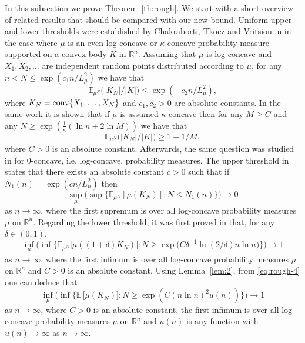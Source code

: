 \documentclass[11pt,leqno]{article}
\theoremstyle{definition}
\theoremstyle{remark}
\numberwithin{equation}{section}
\newcommand{\ls}{\leqslant}
\newcommand{\gr}{\geqslant}
\newcommand{\1}{\textbf{1}}
\begin{document}
In this subsection we prove Theorem~\ref{th:rough}. We start with a short overview of related results that should be
compared with our new bound. Uniform upper and lower thresholds were established by Chakraborti, Tkocz and Vritsiou in \cite{Chakraborti-Tkocz-Vritsiou-2021} in the case where $\mu $ is an even log-concave or $\kappa$-concave probability
measure supported on a convex body $K$ in ${\mathbb R}^n$. Assuming that $\mu$ is log-concave and $X_1,X_2,\ldots $ are independent random points distributed according to $\mu $, for any $n<N\ls \exp (c_1n/L_{\mu }^2)$ we have that
\begin{equation}\label{eq:rough-1}{\mathbb E}_{\mu^N}\big(|K_N|/|K|\big) \ls \exp\left(-c_2n/L_{\mu }^2\right),\end{equation}
where $K_N={\rm conv}\{X_1,\ldots ,X_N\}$ and $c_1,c_2>0$ are absolute constants. In the same work it is
shown that if $\mu $ is assumed $\kappa $-concave then for any $M\gr C$ and any $N\gr \exp\left(\frac{1}{\kappa }(\ln n+2\ln M)\right)$ we have that
\begin{equation}\label{eq:rough-2}{\mathbb E}_{\mu^N}\big(|K_N|/|K|\big)\gr 1-1/M,\end{equation}
where $C>0$ is an absolute constant. Afterwards, the same question was studied in \cite{BGP-depth} for $0$-concave, i.e. log-concave, probability measures. The upper threshold in \cite{BGP-depth} states that there exists an absolute constant $c>0$ such that if $N_1(n)=\exp (cn/L_n^2)$ then
\begin{equation}\label{eq:rough-3}\sup_{\mu }\Big(\sup\Big\{{\mathbb E}_{\mu^N}[\mu (K_N)]:N\ls N_1(n)\Big\}\Big)\longrightarrow 0\end{equation}
as $n\to\infty $, where the first supremum is over all log-concave probability measures $\mu $ on ${\mathbb R}^n$.
Regarding the lower threshold, it was first proved in \cite{BGP-depth} that, for any $\delta\in (0,1)$,
\begin{equation}\label{eq:rough-4}\inf_{\mu }\Big(\inf\Big\{ {\mathbb E}_{\mu^N}\big[\mu ((1+\delta )K_N)\big]: N\gr \exp \big (C\delta^{-1}\ln \left(2/\delta \right)n\ln n\big )\Big\}\Big)\longrightarrow 1\end{equation} as $n\to\infty $, where the first infimum is over all log-concave probability measures $\mu $ on ${\mathbb R}^n$ and $C>0$ is an absolute constant.
Using Lemma~\ref{lem:2}, from \eqref{eq:rough-4} one can deduce that
\begin{equation}\label{eq:rough-5}\inf_{\mu }\Big(\inf\Big\{ {\mathbb E}\,\big[\mu (K_N)\big]: N\gr \exp (C(n\ln n)^2u(n))\Big\}\Big)\longrightarrow 1\end{equation}
as $n\to\infty $, where $C>0$ is an absolute constant, the first infimum is over all log-concave probability measures
$\mu $ on ${\mathbb R}^n$ and $u(n)$ is any function with $u(n)\to\infty $ as $n\to\infty $.
\end{document}
